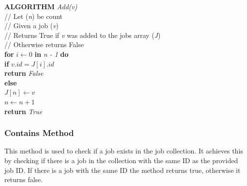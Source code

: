 \documentclass[12pt,a4paper]{article}
\begin{document}
				\textbf{ALGORITHM} \textit{Add(v)}\\
				\null\hspace{1cm}// Let (\textit{n}) be count\\
				\null\hspace{1cm}// Given a job (\textit{v})\\
				\null\hspace{1cm}// Returns True if \textit{v} was added to the jobs array (\textit{J})\\
				\null\hspace{1cm}// Otherwise returns False\\
				\null\hspace{1cm}\textbf{for} \textit{$i \gets 0$} \textbf{in} \textit{n - 1} \textbf{do}\\
				\null\hspace{2cm}\textbf{if} \textit{$v.id = J[i].id$}\\
				\null\hspace{3cm}\textbf{return} \textit{False}\\
				\null\hspace{1cm}\textbf{else}\\
				\null\hspace{2cm}\textit{$J[n] \gets v$}\\
				\null\hspace{2cm}\textit{$n \gets n + 1$}\\
				\null\hspace{2cm}\textbf{return} \textit{True}\\

			\subsubsection{Contains Method}
				This method is used to check if a job exists in the job collection. It achieves this by 
				checking if there is a job in the collection with the same ID as the provided job ID. If there is 
				a job with the same ID the method returns true, otherwise it returns false.\\
\end{document}
